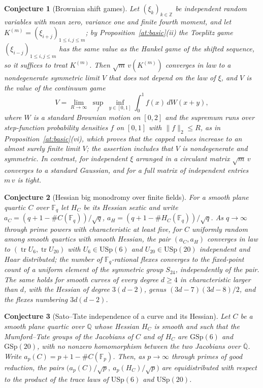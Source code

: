 \documentclass[11pt]{article}
\newtheorem{conjecture}{Conjecture}
\theoremstyle{definition}
\newcommand{\Fq}{\mathbb F}
\newcommand{\Z}{\mathbb Z}
\newcommand{\Q}{\mathbb Q}
\providecommand{\Z}{\mathbb Z}
\providecommand{\Q}{\mathbb Q}
\begin{document}
\begin{conjecture}[Brownian shift games]\label{at10}
Let $(\xi_k)_{k\in\Z}$ be independent random variables with mean zero,
variance one and finite fourth moment, and let
$K^{(m)}=(\xi_{i+j})_{1\le i,j\le m}$; by Proposition~\ref{at:basic}(ii) the
Toeplitz game $(\xi_{i-j})_{1\le i,j\le m}$ has the same value as the Hankel
game of the shifted sequence, so it suffices to treat $K^{(m)}$.  Then
$\sqrt m\,v(K^{(m)})$ converges in law to a nondegenerate symmetric limit
$V$ that does not depend on the law of $\xi$, and $V$ is the value of the continuum game
\[
 V=\lim_{R\to\infty}\ \sup_{f}\ \inf_{y\in[0,1]}\int_0^1f(x)\,dW(x+y),
\]
where $W$ is a standard Brownian motion on $[0,2]$ and the supremum runs
over step-function probability densities $f$ on $[0,1]$ with
$\|f\|_2\le R$, as in Proposition~\ref{at:basic}(vi), which proves that the
capped values increase to an almost surely finite limit $V$; the assertion
includes that $V$ is nondegenerate and symmetric.  In contrast, for independent
$\xi$ arranged in a circulant matrix $\sqrt m\,v$ converges to a standard
Gaussian, and for a full matrix of independent entries $m\,v$ is tight.
\end{conjecture}


\begin{conjecture}[Hessian big monodromy over finite fields]\label{at11}
For a smooth plane quartic $C$ over $\Fq_q$ let $H_C$ be its Hessian sextic
and write $a_C=(q+1-\#C(\Fq_q))/\sqrt q$, $a_H=(q+1-\#H_C(\Fq_q))/\sqrt q$.
As $q\to\infty$ through prime powers with characteristic at least five,
for $C$ uniformly random among smooth quartics with smooth Hessian, the pair
$(a_C,a_H)$ converges in law to $(\operatorname{tr}U_6,\operatorname{tr}U_{20})$
with $U_6\in\mathrm{USp}(6)$ and $U_{20}\in\mathrm{USp}(20)$ independent and
Haar distributed; the number of $\Fq_q$-rational flexes converges to the
fixed-point count of a uniform element of the symmetric group $S_{24}$,
independently of the pair.  The same holds for smooth curves of every
degree $d\ge4$ in characteristic larger than $d$, with the Hessian of degree
$3(d-2)$, genus $(3d-7)(3d-8)/2$, and the flexes numbering $3d(d-2)$.
\end{conjecture}


\begin{conjecture}[Sato--Tate independence of a curve and its Hessian]\label{at12}
Let $C$ be a smooth plane quartic over $\Q$ whose Hessian $H_C$ is smooth
and such that the Mumford--Tate groups of the Jacobians of $C$ and of $H_C$
are $\mathrm{GSp}(6)$ and $\mathrm{GSp}(20)$, with no nonzero homomorphism
between the two Jacobians over $\overline{\Q}$.  Write
$a_p(C)=p+1-\#C(\Fq_p)$.  Then, as $p\to\infty$ through primes of good
reduction, the pairs $\bigl(a_p(C)/\sqrt p,\ a_p(H_C)/\sqrt p\bigr)$ are
equidistributed with respect
to the product of the trace laws of $\mathrm{USp}(6)$ and $\mathrm{USp}(20)$.
\end{conjecture}
\end{document}
